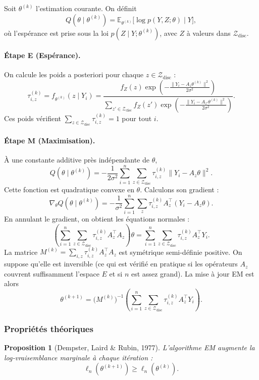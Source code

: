 \documentclass[12pt, a4paper]{article}
\newtheorem{proposition}[theorem]{Proposition}
\theoremstyle{definition}
\newcommand{\E}{\mathbb{E}}
\begin{document}
Soit $\theta^{(k)}$ l'estimation courante. On définit
\[
Q(\theta \mid \theta^{(k)}) = \E_{\theta^{(k)}}\!\bigl[ \log p(Y,Z;\theta) \mid Y \bigr],
\]
où l'espérance est prise sous la loi $p(Z \mid Y;\theta^{(k)})$, avec $Z$ à valeurs dans $\mathcal{Z}_{\text{disc}}$.

\paragraph{Étape E (Espérance).}
On calcule les poids a posteriori pour chaque $z \in \mathcal{Z}_{\text{disc}}$ :
\[
\tau_{i,z}^{(k)} = f_{\theta^{(k)}}(z \mid Y_i)
= \frac{ f_Z(z) \exp\!\left( -\frac{\|Y_i - A_z\theta^{(k)}\|^2}{2\sigma^2} \right) }{ \sum_{z'\in\mathcal{Z}_{\text{disc}}} f_Z(z') \exp\!\left( -\frac{\|Y_i - A_{z'}\theta^{(k)}\|^2}{2\sigma^2} \right) }.
\]
Ces poids vérifient $\sum_{z\in\mathcal{Z}_{\text{disc}}} \tau_{i,z}^{(k)} = 1$ pour tout $i$.

\paragraph{Étape M (Maximisation).}
À une constante additive près indépendante de $\theta$,
\[
Q(\theta \mid \theta^{(k)}) = -\frac{1}{2\sigma^2} \sum_{i=1}^n \sum_{z\in\mathcal{Z}_{\text{disc}}} \tau_{i,z}^{(k)} \|Y_i - A_z\theta\|^2.
\]
Cette fonction est quadratique convexe en $\theta$. Calculons son gradient :
\[
\nabla_\theta Q(\theta \mid \theta^{(k)}) = -\frac{1}{\sigma^2} \sum_{i=1}^n \sum_{z} \tau_{i,z}^{(k)} A_z^\top (Y_i - A_z\theta).
\]
En annulant le gradient, on obtient les équations normales :
\[
\left( \sum_{i=1}^n \sum_{z\in\mathcal{Z}_{\text{disc}}} \tau_{i,z}^{(k)} A_z^\top A_z \right) \theta = \sum_{i=1}^n \sum_{z\in\mathcal{Z}_{\text{disc}}} \tau_{i,z}^{(k)} A_z^\top Y_i.
\]
La matrice $M^{(k)} = \sum_{i,z} \tau_{i,z}^{(k)} A_z^\top A_z$ est symétrique semi-définie positive. On suppose qu'elle est inversible (ce qui est vérifié en pratique si les opérateurs $A_z$ couvrent suffisamment l'espace $E$ et si $n$ est assez grand). La mise à jour EM est alors
\[
\boxed{ \theta^{(k+1)} = \bigl(M^{(k)}\bigr)^{-1} \left( \sum_{i=1}^n \sum_{z\in\mathcal{Z}_{\text{disc}}} \tau_{i,z}^{(k)} A_z^\top Y_i \right) }.
\]

\subsubsection{Propriétés théoriques}

\begin{proposition}[Dempster, Laird \& Rubin, 1977]
L'algorithme EM augmente la log‑vraisemblance marginale à chaque itération :
\[
\ell_n(\theta^{(k+1)}) \ge \ell_n(\theta^{(k)}).
\]
\end{proposition}
\end{document}
